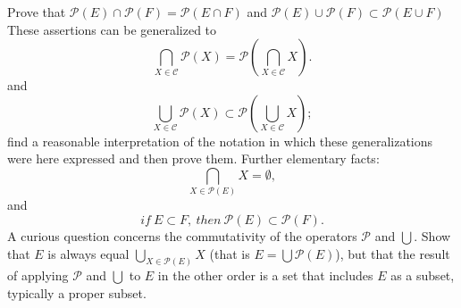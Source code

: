 \begin{exercise} Prove that $ \mathcal{P} (E) \cap \mathcal{P} (F) = \mathcal{P}(E \cap F) $ and $ \mathcal{P} (E) \cup \mathcal{P} (F) \subset \mathcal{P}(E \cup F) $ These assertions can be generalized to 
\begin{equation*}
\bigcap_{X \in \mathcal{C}} \mathcal{P} (X) = \mathcal{P} ( \bigcap_{X \in \mathcal{C}} X) .
\end{equation*}
and
\begin{equation*}
\bigcup_{X \in \mathcal{C}} \mathcal{P} (X) \subset \mathcal{P} ( \bigcup_{X \in \mathcal{C}} X) ;
\end{equation*}
find a reasonable interpretation of the notation in which these generalizations were here expressed and then prove them. Further  elementary facts: 
\begin{equation*}
\bigcap_{X \in \mathcal{P} (E)} X = \emptyset ,
\end{equation*}
and 
\begin{equation*}
if \: E \subset F , \: then \: \mathcal{P} (E) \subset \mathcal{P} (F).
\end{equation*}
A curious question concerns the commutativity of the operators $ \mathcal{P} $ and $ \bigcup $. Show that $E$ is always equal $\bigcup_{X \in \mathcal{P} (E)} X $ (that is $ E = \bigcup \mathcal{P} (E) $), but that the result of applying $\mathcal{P} $ and $ \bigcup $ to $E$ in the other order is a set that includes $E$ as a subset, typically a proper subset.
\end{exercise}